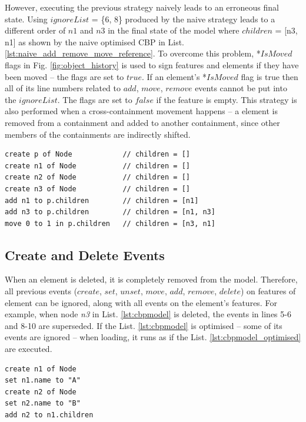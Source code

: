 \documentclass{llncs}
\begin{document}
{However, executing the previous strategy naively leads to an erroneous final state. Using $ignoreList$ = \{6, 8\} produced by the naive strategy leads to a different order of $n1$ and $n3$ in the final state of the model where $children$ = [n3, n1] as shown by the naive optimised CBP in List. \ref{lst:naive_add_remove_move_reference}. To overcome this problem, *$IsMoved$ flags in Fig. \ref{fig:object_history} is used to sign  features and elements if they have been moved -- the flags are set to $true$. If an element's *$IsMoved$ flag is true then all of its line numbers related to $add$, $move$, $remove$ events cannot be put into the $ignoreList$. The flags are set to $false$ if the feature is empty. This strategy is also performed when a cross-containment movement happens -- a element is removed from a containment and added to another containment, since other members of the containments are indirectly shifted.

\begin{lstlisting}[style=eol,caption={A naive optimised CBP representation of original CBP representation in List. \ref{lst:add_remove_move_reference} .},label=lst:naive_add_remove_move_reference]
create p of Node            // children = []
create n1 of Node           // children = []
create n2 of Node           // children = []
create n3 of Node           // children = []
add n1 to p.children        // children = [n1]
add n3 to p.children        // children = [n1, n3]
move 0 to 1 in p.children   // children = [n3, n1]
\end{lstlisting}

\vspace{-20pt}
\subsection{Create and Delete Events}
\label{subsec:create_and_delete_operations}

\vspace{-10pt}
When an element is deleted, it is completely removed from the model. Therefore, all previous events ($create$, $set$, $unset$, $move$, $add$, $remove$, $delete$) on features of element can be ignored, along with all events on the element's features. For example, when node \emph{n3} in List. \ref{lst:cbpmodel} is deleted, the events in lines 5-6 and 8-10 are superseded. If the List. \ref{lst:cbpmodel} is optimised -- some of its events are ignored -- when loading, it runs as if the List. \ref{lst:cbpmodel_optimised} are executed.

\begin{lstlisting}[style=eol,caption={Change-based representation of the model in Fig. \ref{fig:initial_model} after removal of node $n3$.},label=lst:cbpmodel_optimised]
create n1 of Node
set n1.name to "A"
create n2 of Node
set n2.name to "B"
add n2 to n1.children
\end{lstlisting}

}
\end{document}

